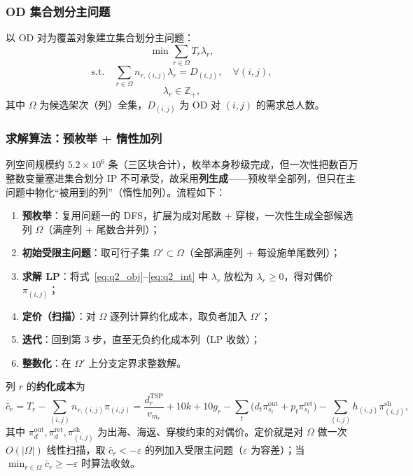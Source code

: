 \documentclass[UTF8,zihao=-4]{ctexart}
\numberwithin{figure}{section}
\numberwithin{table}{section}
\begin{document}
\subsubsection{OD 集合划分主问题}

以 OD 对为覆盖对象建立集合划分主问题：
\begin{equation}
  \min \sum_{r\in\Omega} T_r\lambda_r,\label{eq:q2_obj}
\end{equation}
\begin{equation}
  \text{s.t.}\quad \sum_{r\in\Omega} n_{r,(i,j)}\lambda_r=D_{(i,j)},\quad\forall(i,j),\label{eq:q2_cov}
\end{equation}
\begin{equation}
  \lambda_r\in\mathbb{Z}_+,\label{eq:q2_int}
\end{equation}
其中 $\Omega$ 为候选架次（列）全集，$D_{(i,j)}$ 为 OD 对 $(i,j)$ 的需求总人数。

\subsubsection{求解算法：预枚举 + 惰性加列}

列空间规模约 $5.2\times10^6$ 条（三区块合计），枚举本身秒级完成，但一次性把数百万整数变量塞进集合划分 IP 不可承受，故采用\textbf{列生成}——预枚举全部列，但只在主问题中物化“被用到的列”（惰性加列）。流程如下：

\begin{enumerate}
  \item \textbf{预枚举}：复用问题一的 DFS，扩展为成对尾数 + 穿梭，一次性生成全部候选列 $\Omega$（满座列 + 尾数合并列）；
  \item \textbf{初始受限主问题}：取可行子集 $\Omega'\subset\Omega$（全部满座列 + 每设施单尾数列）；
  \item \textbf{求解 LP}：将式~\eqref{eq:q2_obj}--\eqref{eq:q2_int} 中 $\lambda_r$ 放松为 $\lambda_r\ge0$，得对偶价 $\pi_{(i,j)}$；
  \item \textbf{定价（扫描）}：对 $\Omega$ 逐列计算约化成本，取负者加入 $\Omega'$；
  \item \textbf{迭代}：回到第 3 步，直至无负约化成本列（LP 收敛）；
  \item \textbf{整数化}：在 $\Omega'$ 上分支定界求整数解。
\end{enumerate}

列 $r$ 的\textbf{约化成本}为
\begin{equation}
  \bar c_r=T_r-\sum_{(i,j)}n_{r,(i,j)}\pi_{(i,j)}
  =\frac{d_r^{\mathrm{TSP}}}{v_{m_r}}+10k+10g_r-\sum_{t}\big(d_t\pi^{\mathrm{out}}_{s_t}+p_t\pi^{\mathrm{ret}}_{s_t}\big)-\sum_{(i,j)}h_{(i,j)}\pi^{\mathrm{sh}}_{(i,j)},
\end{equation}
其中 $\pi^{\mathrm{out}}_d,\pi^{\mathrm{ret}}_d,\pi^{\mathrm{sh}}_{(i,j)}$ 为出海、海返、穿梭约束的对偶价。定价就是对 $\Omega$ 做一次 $O(|\Omega|)$ 线性扫描，取 $\bar c_r<-\varepsilon$ 的列加入受限主问题（$\varepsilon$ 为容差）；当 $\min_{r\in\Omega}\bar c_r\ge-\varepsilon$ 时算法收敛。
\end{document}
